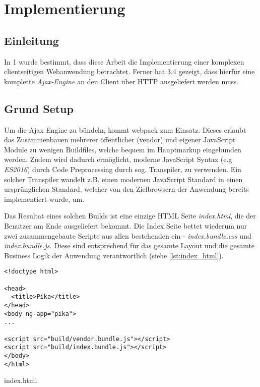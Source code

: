 \chapter{Implementierung}

\section{Einleitung}

In 1 wurde bestimmt, dass diese Arbeit die Implementierung einer komplexen clientseitigen Webanwendung betrachtet. Ferner hat 3.4 gezeigt, dass hierfür eine komplette \textit{Ajax-Engine} an den Client über HTTP ausgeliefert werden muss.

\section{Grund Setup}

Um die Ajax Engine zu bündeln, kommt \gls{webpack} zum Einsatz. Dieses erlaubt das Zusammenbauen mehrerer öffentlicher (vendor) und eigener JavaScript Module zu wenigen Buildfiles, welche bequem im Hauptmarkup eingebunden werden. Zudem wird dadurch ermöglicht, moderne JavaScript Syntax (e.g \textit{ES2016}) durch Code Preprocessing durch sog. Transpiler, zu verwenden. Ein solcher Transpiler wandelt z.B. einen modernen JavaScript Standard in einen ursprünglichen Standard, welcher von den Zielbrowsern der Anwendung bereits implementiert wurde, um.

Das Resultat eines solchen Builds ist eine einzige HTML Seite \textit{index.html}, die der Benutzer am Ende ausgeliefert bekommt. Die Index Seite bettet wiederum nur zwei zusammengebaute Scripte aus allen bestehenden ein - \textit{index.bundle.css} und \textit{index.bundle.js}. Diese sind entsprechend für das gesamte Layout und die gesamte Business Logik der Anwendung verantwortlich (siehe \ref{lst:index_html}).

\begin{listing}[H]
\begin{verbatim}
<!doctype html>

<head>
  <title>Pika</title>
</head>
<body ng-app="pika">
...

<script src="build/vendor.bundle.js"></script>
<script src="build/index.bundle.js"></script>
</body>
</html>

\end{verbatim}
\caption{index.html}
\label{lst:index_html}
\end{listing}

